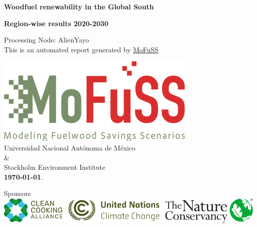 \documentclass{article}
\def\nodename{AlienYayo}
\begin{document}
	\begin{titlepage}
		\centering
		\vspace*{1cm} %
		    
		\Huge
		\textbf{Woodfuel renewability in the Global South}
		    
		\vspace{0.5cm} %
		\LARGE
		 \textbf{Region-wise results 2020-2030}
		    
		\vspace{1.5cm}
		 
		Processing Node: \nodename\\
		This is an automated report generated by \href{https://www.mofuss.unam.mx}{MoFuSS}
   
		
		\vfill %
		
		\includegraphics[width=0.5\linewidth]{./logos/mofuss_366.png}\\
		\vspace{1.5cm}
		\Large
		\centering %
		Universidad Nacional Autónoma de México\\
		\&\\
		 Stockholm Environment Institute\\[1ex] %
		\Large
		\centering
		\textbf{\today}.
		\vspace{2.5cm} %
		
		Sponsors
		\includegraphics[width=\linewidth]{./logos/sponsors_banner.png}
	    
	\end{titlepage}
\end{document}
